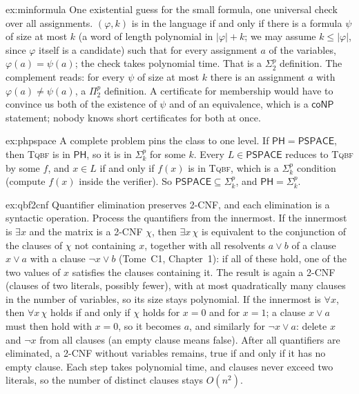 \begin{solution}{ex:minformula}
\idea One existential guess for the small formula, one universal check over all assignments.
\writeup $(\varphi,k)$ is in the language if and only if there is a formula $\psi$ of size at most $k$ (a word of length polynomial in $|\varphi|+k$; we may assume $k\le|\varphi|$, since $\varphi$ itself is a candidate) such that for every assignment $a$ of the variables, $\varphi(a)=\psi(a)$; the check takes polynomial time. That is a $\Sigma_2^p$ definition. The complement reads: for every $\psi$ of size at most $k$ there is an assignment $a$ with $\varphi(a)\ne\psi(a)$, a $\Pi_2^p$ definition. A certificate for membership would have to convince us both of the existence of $\psi$ and of an equivalence, which is a $\mathsf{coNP}$ statement; nobody knows short certificates for both at once.
\end{solution}

\begin{solution}{ex:phpspace}
\idea A complete problem pins the class to one level.
\writeup If $\mathsf{PH}=\mathsf{PSPACE}$, then \textup{\textsc{Tqbf}} is in $\mathsf{PH}$, so it is in $\Sigma_k^p$ for some $k$. Every $L\in\mathsf{PSPACE}$ reduces to \textup{\textsc{Tqbf}} by some $f$, and $x\in L$ if and only if $f(x)$ is in \textup{\textsc{Tqbf}}, which is a $\Sigma_k^p$ condition (compute $f(x)$ inside the verifier). So $\mathsf{PSPACE}\subseteq\Sigma_k^p$, and $\mathsf{PH}=\Sigma_k^p$.
\end{solution}

\begin{solution}{ex:qbf2cnf}
\idea Quantifier elimination preserves 2-CNF, and each elimination is a syntactic operation.
\writeup Process the quantifiers from the innermost. If the innermost is $\exists x$ and the matrix is a 2-CNF $\chi$, then $\exists x\,\chi$ is equivalent to the conjunction of the clauses of $\chi$ not containing $x$, together with all resolvents $a\lor b$ of a clause $x\lor a$ with a clause $\neg x\lor b$ (Tome~C1, Chapter~1): if all of these hold, one of the two values of $x$ satisfies the clauses containing it. The result is again a 2-CNF (clauses of two literals, possibly fewer), with at most quadratically many clauses in the number of variables, so its size stays polynomial. If the innermost is $\forall x$, then $\forall x\,\chi$ holds if and only if $\chi$ holds for $x=0$ and for $x=1$; a clause $x\lor a$ must then hold with $x=0$, so it becomes $a$, and similarly for $\neg x\lor a$: delete $x$ and $\neg x$ from all clauses (an empty clause means false). After all quantifiers are eliminated, a 2-CNF without variables remains, true if and only if it has no empty clause. Each step takes polynomial time, and clauses never exceed two literals, so the number of distinct clauses stays $O(n^2)$.
\end{solution}

